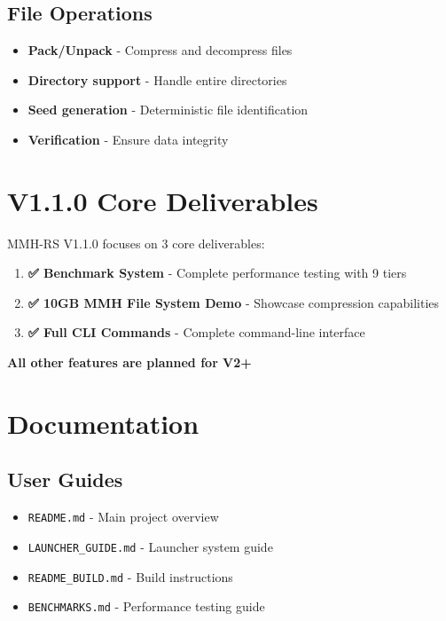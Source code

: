 \documentclass[11pt,a4paper]{article}
\begin{document}
	\subsection{File Operations}
	\begin{itemize}
		\item \textbf{Pack/Unpack} - Compress and decompress files
		\item \textbf{Directory support} - Handle entire directories
		\item \textbf{Seed generation} - Deterministic file identification
		\item \textbf{Verification} - Ensure data integrity
	\end{itemize}

	\section{V1.1.0 Core Deliverables}
	\label{sec:deliverables}

	MMH-RS V1.1.0 focuses on 3 core deliverables:

	\begin{enumerate}
		\item \textbf{✅ Benchmark System} - Complete performance testing with 9 tiers
		\item \textbf{✅ 10GB MMH File System Demo} - Showcase compression capabilities
		\item \textbf{✅ Full CLI Commands} - Complete command-line interface
	\end{enumerate}

	\textbf{All other features are planned for V2+}

	\section{Documentation}
	\label{sec:documentation}

	\subsection{User Guides}
	\begin{itemize}
		\item \texttt{README.md} - Main project overview
		\item \texttt{LAUNCHER\_GUIDE.md} - Launcher system guide
		\item \texttt{README\_BUILD.md} - Build instructions
		\item \texttt{BENCHMARKS.md} - Performance testing guide
	\end{itemize}
\end{document}
